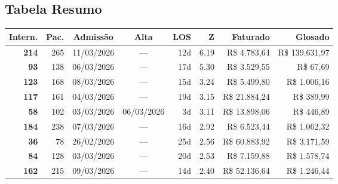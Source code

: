 \documentclass[a4paper,10pt]{article}
\begin{document}
\subsection{Tabela Resumo}
\begin{center}
\begin{longtable}{>{\scriptsize}r>{\scriptsize}r>{\scriptsize}c>{\scriptsize}c>{\scriptsize}r>{\scriptsize}r>{\scriptsize}r>{\scriptsize}r}
\toprule
\textbf{Intern.} & \textbf{Pac.} & \textbf{Admiss\~{a}o} & \textbf{Alta} & \textbf{LOS} & \textbf{Z} & \textbf{Faturado} & \textbf{Glosado} \\
\midrule
\endhead
\bottomrule
\endfoot

\textcolor{anomred}{\textbf{214}} & 265 & 11/03/2026 & — & 12d & \textcolor{anomred}{6.19} & R\$ 4.783,64 & \textcolor{anomred}{R\$ 139.631,97} \\

\textcolor{anomred}{\textbf{93}} & 138 & 06/03/2026 & — & 17d & \textcolor{anomred}{5.30} & R\$ 3.529,55 & \textcolor{anomred}{R\$ 67,69} \\

\textcolor{anomorange}{\textbf{123}} & 168 & 08/03/2026 & — & 15d & \textcolor{anomorange}{3.24} & R\$ 5.499,80 & \textcolor{anomred}{R\$ 1.006,16} \\

\textcolor{anomorange}{\textbf{117}} & 161 & 04/03/2026 & — & 19d & \textcolor{anomorange}{3.15} & R\$ 21.884,24 & \textcolor{anomred}{R\$ 389,99} \\

\textcolor{anomorange}{\textbf{58}} & 102 & 03/03/2026 & 06/03/2026 & 3d & \textcolor{anomorange}{3.11} & R\$ 13.898,06 & \textcolor{anomred}{R\$ 446,89} \\

\textcolor{anomyellow}{\textbf{184}} & 238 & 07/03/2026 & — & 16d & \textcolor{anomyellow}{2.92} & R\$ 6.523,44 & \textcolor{anomred}{R\$ 1.062,32} \\

\textcolor{anomyellow}{\textbf{36}} & 78 & 26/02/2026 & — & 25d & \textcolor{anomyellow}{2.56} & R\$ 60.883,92 & \textcolor{anomred}{R\$ 3.171,59} \\

\textcolor{anomyellow}{\textbf{84}} & 128 & 03/03/2026 & — & 20d & \textcolor{anomyellow}{2.53} & R\$ 7.159,88 & \textcolor{anomred}{R\$ 1.578,74} \\

\textcolor{anomyellow}{\textbf{162}} & 215 & 09/03/2026 & — & 14d & \textcolor{anomyellow}{2.40} & R\$ 52.136,64 & \textcolor{anomred}{R\$ 1.246,44} \\


\end{longtable}
\end{center}
\end{document}
